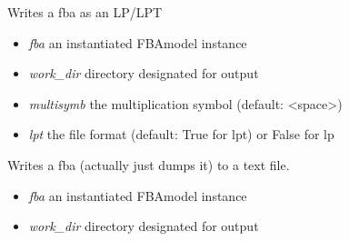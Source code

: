 \documentclass[a4paper,11pt,english]{sphinxmanual}
\begin{document}

\begin{fulllineitems}
\label{modules_doc:cbmpy.CBWrite.writeModelLPOld}
Writes a fba as an LP/LPT
\begin{itemize}
\item {} 
\emph{fba} an instantiated FBAmodel instance

\item {} 
\emph{work\_dir} directory designated for output

\item {} 
\emph{multisymb} the multiplication symbol (default: \textless{}space\textgreater{})

\item {} 
\emph{lpt} the file format (default: True for lpt) or False for lp

\end{itemize}

\end{fulllineitems}


\begin{fulllineitems}
\label{modules_doc:cbmpy.CBWrite.writeModelRaw}
Writes a fba (actually just dumps it) to a text file.
\begin{itemize}
\item {} 
\emph{fba} an instantiated FBAmodel instance

\item {} 
\emph{work\_dir} directory designated for output

\end{itemize}

\end{fulllineitems}

\end{document}
